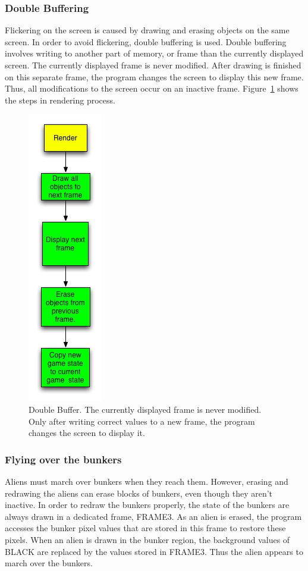 \documentclass[11pt,letter,oneside]{report}
\begin{document}
\subsubsection{Double Buffering}
Flickering on the screen is caused by drawing and erasing objects on the same screen. In order to avoid flickering, double buffering is used. Double buffering involves writing to another part of memory, or frame than the currently displayed screen. The currently displayed frame is never modified.  After drawing is finished on this separate frame, the program changes the screen to display this new frame. Thus, all modifications to the screen occur on an inactive frame. Figure~\ref{fig:render} shows the steps in rendering process.

\begin{figure}[H]
\centering
\includegraphics[scale=.8]{Render.jpg}
\caption{Double Buffer. The currently displayed frame is never modified. Only after writing correct values to a new frame, the program changes the screen to display it.}
\label{fig:render}
\end{figure}

\subsubsection{Flying over the bunkers}
Aliens must march over bunkers when they reach them. However, erasing and redrawing the aliens can erase blocks of bunkers, even though they aren't inactive. In order to redraw the bunkers properly, the state of the bunkers are always drawn in a dedicated frame, FRAME3.  As an alien is erased, the program accesses the bunker pixel values that are stored in this frame to restore these pixels. When an alien is drawn in the bunker region, the background values of BLACK are replaced by the values stored in FRAME3. Thus the alien appears to march over the bunkers.
\end{document}
